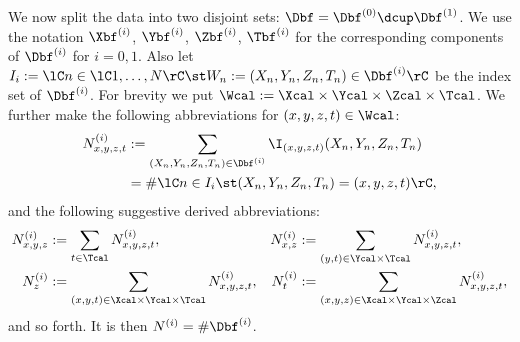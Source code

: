 We now split the data into two disjoint sets: $\Dbf = \Dbf^{(0)} \dcup \Dbf^{(1)}$. 
We use the notation $\Xbf^{(i)}$, $\Ybf^{(i)}$, $\Zbf^{(i)}$, $\Tbf^{(i)}$ for the corresponding components of $\Dbf^{(i)}$ for $i=0,1$.
Also let $I_i:=\lC n \in \lC 1,\dots,N \rC \st W_n:= (X_n,Y_n,Z_n,T_n) \in \Dbf^{(i)} \rC$ be the index set of $\Dbf^{(i)}$.
For brevity we put $\Wcal:=\Xcal\times\Ycal\times\Zcal\times\Tcal$.
We further make the following abbreviations for $(x,y,z,t) \in \Wcal$:
\begin{align*}
    N^{(i)}_{x,y,z,t} &:=  \sum_{(X_n,Y_n,Z_n,T_n) \in \Dbf^{(i)}} \I_{(x,y,z,t)}(X_n,Y_n,Z_n,T_n) \\ 
    &= \#\lC n \in I_i \st (X_n,Y_n,Z_n,T_n) = (x,y,z,t) \rC,
\end{align*}
and the following suggestive derived abbreviations:
\begin{align*}
    N^{(i)}_{x,y,z} &:=  \sum_{t \in \Tcal} N^{(i)}_{x,y,z,t}, &
    N^{(i)}_{x,z} &:=  \sum_{(y,t) \in \Ycal\times\Tcal} N^{(i)}_{x,y,z,t},\\
    N^{(i)}_{z} &:=  \sum_{(x,y,t) \in \Xcal\times\Ycal\times\Tcal} N^{(i)}_{x,y,z,t},&
    N^{(i)}_{t} &:=  \sum_{(x,y,z) \in \Xcal\times\Ycal\times\Zcal} N^{(i)}_{x,y,z,t},
\end{align*}
and so forth. It is then $N^{(i)} = \#\Dbf^{(i)}$.

